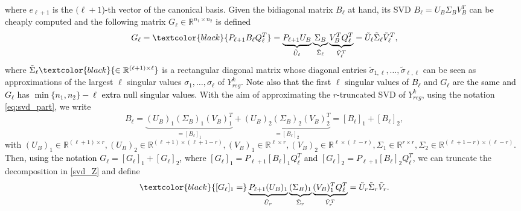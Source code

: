 \documentclass[pdflatex,sn-mathphys-num]{sn-jnl}
\numberwithin{equation}{section}%
\def\R{\mathbb{R}}
\newcommand{\Yck}{{Y_{reg}^k}}
\newcommand{\cZ}{G}
\newcommand{\ML}{G}
\newcommand{\REV}[1]{\textcolor{black}{#1}}
\theoremstyle{thmstyleone}%
\theoremstyle{thmstyletwo}%
\theoremstyle{thmstylethree}%
\begin{document}
where $e_{\ell+1}$ is the $(\ell+1$)-th vector of the canonical basis.
Given the bidiagonal matrix $B_\ell$ at hand,  its SVD $B_\ell = U_B \Sigma_B V_B^T$ can be cheaply computed and   the following matrix $ \ML_\ell\in\R^{n_1\times n_2}$ is \REV{defined}%
\begin{equation} \label{svd_Z}
    \cZ_\ell = \REV{P_{\ell+1} B_{\ell} Q_{\ell}^T}= \underbrace{P_{\ell+1} U_B}_{\tilde U_\ell} \underbrace{\Sigma_B}_{\tilde \Sigma_\ell} \underbrace{V_B^T Q_\ell^T}_{\tilde V_\ell^T}=\tilde U_\ell \tilde \Sigma_\ell \tilde V_\ell^T,
\end{equation}
where $\tilde \Sigma_\ell\REV{\in\mathbb{R}^{(\ell+1)\times \ell}}$ is a rectangular diagonal matrix whose diagonal entries $\tilde \sigma_{1,\ell}, \dots, \tilde \sigma_{\ell,\ell}$ can be seen as approximations of the largest $\ell$ singular values \REV{$\sigma_1,\dots,\sigma_\ell$} of $\Yck$. \REV{Note also that the first $\ell$ singular values of $B_\ell$ and $G_\ell$ are the same and $G_\ell$ has $\min\{n_1,n_2\}-\ell$ extra null singular values.}
With the aim of approximating the $r$-truncated SVD of $\Yck$, using the {notation  \eqref{eq:svd_part}}, we  write 
\[
    B_\ell = \underbrace{(U_{B})_1 (\Sigma_{B})_1 (V_{B})_1^T}_{=[B_{\ell}]_1} + \underbrace{(U_B)_{2} (\Sigma_B)_{2} (V_B)_{2}^T}_{=[B_{\ell}]_2}=[B_{\ell}]_1+[B_{\ell}]_2 ,
\]
with $(U_B)_1 \in \R^{(\ell+1) \times r}, (U_B)_2 \in \R^{(\ell+1) \times (\ell+1-r)}, (V_B)_1 \in \R^{\ell \times r}, (V_B)_2 \in \R^{\ell \times (\ell-r)}, \Sigma_1 \in \R^{r \times r}, \Sigma_2 \in \R^{(\ell+1-r) \times (\ell-r)}$. Then, \REV{using the notation $G_{\ell} = [G_{\ell}]_1+[G_{\ell}]_2$, where $[G_{\ell}]_1 = P_{\ell+1} [B_{\ell}]_1Q_\ell^T$ and $[G_{\ell}]_2 = P_{\ell+1} [B_{\ell}]_2Q_\ell^T$}, we can truncate the decomposition in \eqref{svd_Z} and define
\begin{equation*} \label{eq:wl}  
    \REV{[G_\ell]_1=} \underbrace{P_{\ell+1} (U_{B})_1}_{\tilde U_r} \underbrace{(\Sigma_{B})_1}_{\tilde \Sigma_r} \underbrace{(V_{B})_1^T Q_\ell^T}_{\tilde V_r^T}=\tilde U_r \tilde \Sigma_r \tilde V_r .
\end{equation*}
\end{document}
